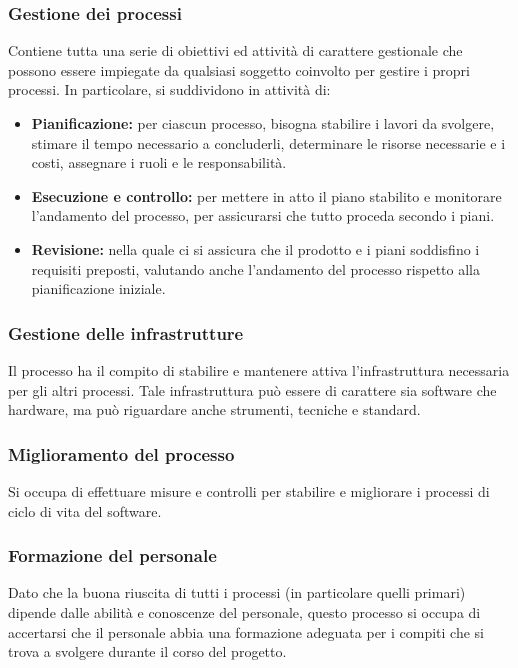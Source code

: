 \subsubsection{Gestione dei processi}
Contiene tutta una serie di obiettivi ed attività di carattere gestionale che possono essere impiegate da qualsiasi soggetto coinvolto per gestire i propri processi. In particolare, si suddividono in attività di:
\begin{itemize}
    \item \textbf{Pianificazione: }per ciascun processo, bisogna stabilire i lavori da svolgere, stimare il tempo necessario a concluderli, determinare le risorse necessarie e i costi, assegnare i ruoli e le responsabilità.
    \item \textbf{Esecuzione e controllo:} per mettere in atto il piano stabilito e monitorare l'andamento del processo, per assicurarsi che tutto proceda secondo i piani.
    \item \textbf{Revisione:} nella quale ci si assicura che il prodotto e i piani soddisfino i requisiti preposti, valutando anche l'andamento del processo rispetto alla pianificazione iniziale.
\end{itemize}
\subsubsection{Gestione delle infrastrutture}
Il processo ha il compito di stabilire e mantenere attiva l'infrastruttura necessaria per gli altri processi. Tale infrastruttura può essere di carattere sia software che hardware, ma può riguardare anche strumenti, tecniche e standard.
\subsubsection{Miglioramento del processo}
Si occupa di effettuare misure e controlli per stabilire e migliorare i processi di ciclo di vita del software.
\subsubsection{Formazione del personale}
Dato che la buona riuscita di tutti i processi (in particolare quelli primari) dipende dalle abilità e conoscenze del personale, questo processo si occupa di accertarsi che il personale abbia una formazione adeguata per i compiti che si trova a svolgere durante il corso del progetto.

\newpage
\newpage
